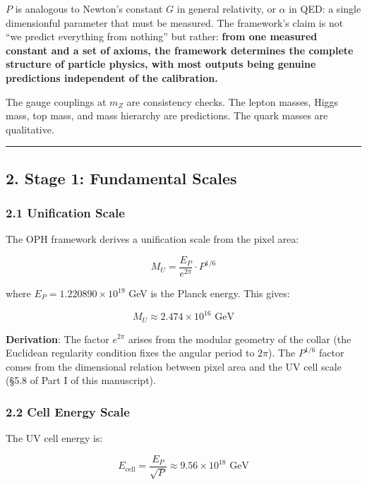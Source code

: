 \(P\) is analogous to Newton's constant \(G\) in general relativity, or \(\alpha\) in QED: a single dimensionful parameter that must be measured. The framework's claim is not ``we predict everything from nothing'' but rather: \textbf{from one measured constant and a set of axioms, the framework determines the complete structure of particle physics, with most outputs being genuine predictions independent of the calibration.}

The gauge couplings at \(m_Z\) are consistency checks. The lepton masses, Higgs mass, top mass, and mass hierarchy are predictions. The quark masses are qualitative.

\begin{center}\rule{0.5\linewidth}{0.5pt}\end{center}

\subsection{2. Stage 1: Fundamental Scales}\label{2-stage-1-fundamental-scales}

\subsubsection{2.1 Unification Scale}\label{21-unification-scale}

The OPH framework derives a unification scale from the pixel area:

\[M_U = \frac{E_P}{e^{2\pi}} \cdot P^{1/6}\]

where \(E_P = 1.220890 \times 10^{19}\) GeV is the Planck energy. This gives:

\[M_U \approx 2.474 \times 10^{16} \text{ GeV}\]

\textbf{Derivation}: The factor \(e^{2\pi}\) arises from the modular geometry of the collar (the Euclidean regularity condition fixes the angular period to \(2\pi\)). The \(P^{1/6}\) factor comes from the dimensional relation between pixel area and the UV cell scale (§5.8 of Part I of this manuscript).

\subsubsection{2.2 Cell Energy Scale}\label{22-cell-energy-scale}

The UV cell energy is:

\[E_{\text{cell}} = \frac{E_P}{\sqrt{P}} \approx 9.56 \times 10^{18} \text{ GeV}\]

